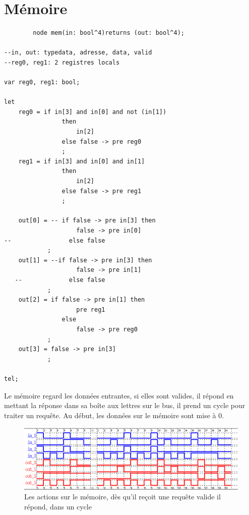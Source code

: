 \documentclass[a4paper,11pt]{report}
\begin{document}
\chapter{Mémoire}
	\begin{framed}
		\begin{verbatim}
		node mem(in: bool^4)returns (out: bool^4);

--in, out: typedata, adresse, data, valid
--reg0, reg1: 2 registres locals

var reg0, reg1: bool;

let
    reg0 = if in[3] and in[0] and not (in[1])
                then
                    in[2]
                else false -> pre reg0
                ;
    reg1 = if in[3] and in[0] and in[1]
                then
                    in[2]
                else false -> pre reg1
                ;

    out[0] = -- if false -> pre in[3] then
                    false -> pre in[0]
--                else false
            ;
    out[1] = --if false -> pre in[3] then
                    false -> pre in[1]
   --             else false
            ;
    out[2] = if false -> pre in[1] then
                    pre reg1
                else
                    false -> pre reg0
            ;
    out[3] = false -> pre in[3]
            ;

tel;

		\end{verbatim}
	\end{framed}
	
	Le mémoire regard les données entrantes, si elles sont valides, il répond en mettant la réponse dans sa boîte aux lettres sur le bus, il prend un cycle pour traiter un requête. Au début, les données sur le mémoire sont mise à 0.
	
	\begin{figure}[!htbp]
		
		\includegraphics[width = 16cm]{mem_diag_1.png}
		\caption{Les actions sur le mémoire, dès qu'il reçoit une requête valide il répond, dans un cycle}
	\end{figure}
	
\end{document}
